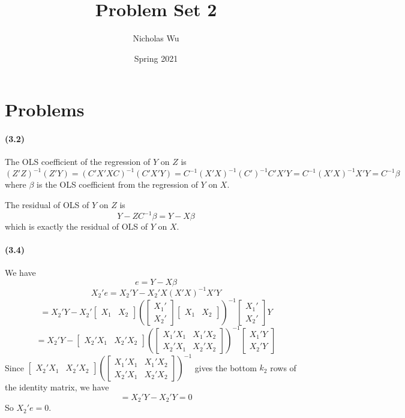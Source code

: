 \documentclass[10pt,letter]{article}
\begin{document}


\title{Problem Set 2}

\author{Nicholas Wu}

\date{Spring 2021}

\maketitle


\section*{Problems}

\paragraph{(3.2)}
The OLS coefficient of the regression of $Y$ on $Z$ is
\[ (Z'Z)^{-1}(Z'Y) = (C'X'XC)^{-1}(C'X'Y) = C^{-1} (X'X)^{-1} (C')^{-1} C'X'Y = C^{-1}(X'X)^{-1} X'Y = C^{-1}\beta \]
where $\beta$ is the OLS coefficient from the regression of $Y$ on $X$.

The residual of OLS of $Y$ on $Z$ is
\[ Y - Z C^{-1}\beta = Y - X \beta \]
which is exactly the residual of OLS of $Y$ on $X$.
\paragraph{(3.4)}
We have
\[ e = Y - X\beta \]
\[ X_2'e = X_2' Y - X_2' X (X'X)^{-1} X'Y \]
\[ =  X_2' Y - X_2' \begin{bmatrix}X_1 & X_2 \end{bmatrix} \left(\begin{bmatrix}X_1' \\ X_2' \end{bmatrix}\begin{bmatrix}X_1 & X_2 \end{bmatrix}\right)^{-1} \begin{bmatrix}X_1' \\ X_2' \end{bmatrix}Y \]
\[ =  X_2' Y -  \begin{bmatrix}X_2'X_1 & X_2'X_2 \end{bmatrix} \left(\begin{bmatrix}X_1'X_1 & X_1'X_2 \\ X_2'X_1 & X_2'X_2 \end{bmatrix}\right)^{-1} \begin{bmatrix}X_1'Y \\ X_2'Y \end{bmatrix} \]
Since $\begin{bmatrix}X_2'X_1 & X_2'X_2 \end{bmatrix} \left(\begin{bmatrix}X_1'X_1 & X_1'X_2 \\ X_2'X_1 & X_2'X_2 \end{bmatrix}\right)^{-1}$ gives the bottom $k_2$ rows of the identity matrix, we have
\[ =  X_2' Y -  X_2' Y = 0 \]
So $X_2'e = 0$.
\end{document}
